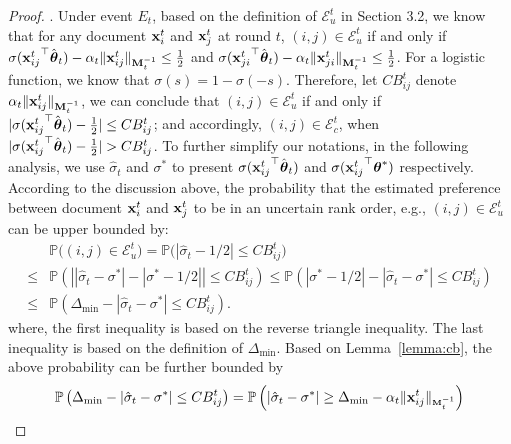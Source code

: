 \begin{proof}
.
Under event $E_t$, based on the definition of $\mathcal{E}_u^t$ in Section 3.2, we know that for any document $\mathbf{x}^t_i$ and $\mathbf{x}^t_j$ at round $t$, $(i, j) \in \mathcal{E}_u^t$ if and only if $\sigma({{\mathbf{x}_{ij}^t}}^\top\hat{\boldsymbol{\theta}}_t) - \alpha_t\Vert{\mathbf{x}_{ij}^t}\Vert_{\mathbf{M}_t^{-1}} \leq \frac{1}{2}$ and $\sigma({{\mathbf{x}_{ji}^t}}^\top\hat{\boldsymbol{\theta}}_t) - \alpha_t\Vert{\mathbf{x}_{ji}^t}\Vert_{\mathbf{M}_t^{-1}} \leq \frac{1}{2}$. 
For a logistic function, we know that $\sigma(s) = 1 - \sigma(-s)$. Therefore, let $CB_{ij}^t$ denote $\alpha_t\Vert{\mathbf{x}_{ij}^t}\Vert_{\mathbf{M}_t^{-1}}$, we can conclude that $(i, j) \in \mathcal{E}_u^t$ if and only if $|\sigma({{\mathbf{x}_{ij}^t}}^\top\hat{\boldsymbol{\theta}}_t )- \frac{1}{2}| \leq CB_{ij}^t$; and accordingly, $(i, j) \in \mathcal{E}_c^t$, when $|\sigma({{\mathbf{x}_{ij}^t}}^\top\hat{\boldsymbol{\theta}}_t) - \frac{1}{2}| > CB_{ij}^t$.  To further simplify our notations, in the following analysis, we use $\hat{\sigma}_t$ and $\sigma^*$ to present $\sigma({{\mathbf{x}_{ij}^t}}^\top\hat{\boldsymbol{\theta}}_t)$ and $\sigma({{\mathbf{x}_{ij}^t}}^\top\boldsymbol{\theta}^*)$ respectively. 
According to the discussion above, the probability that the estimated preference between document $\mathbf{x}^t_i$ and $\mathbf{x}^t_j$ to be in an uncertain rank order, e.g., $(i, j) \in \mathcal{E}_u^t$ can be upper bounded by:
\small
\begin{align*}
    & \mathbb{P}\big((i, j) \in \mathcal{E}_u^t\big) = \mathbb{P}\big(|\hat{\sigma}_t - {1}/{2}| \leq CB_{ij}^t\big) \nonumber \\
    \leq& \mathbb{P}\left(\left||\hat{\sigma}_t - \sigma^*| - |\sigma^* - {1}/{2}|\right| \leq CB_{ij}^t\right) 
    \leq \mathbb{P} \left(|\sigma^* - {1}/{2}| - |\hat{\sigma}_t - \sigma^*| \leq CB_{ij}^t\right) \\
    \leq& \mathbb{P} \left(\Delta_{\min} - |\hat{\sigma}_t - \sigma^*| \leq CB_{ij}^t\right). 
\end{align*}
\normalsize
where, the first inequality is based on the reverse triangle inequality. %
The last inequality is based on the definition of $\Delta_{\min}$. Based on Lemma~\ref{lemma:cb}, the above probability can be further bounded by
\small
\begin{align*}
    &\mathbb{P} \left(\Delta_{\min} - |\hat{\sigma}_t - \sigma^*| \leq CB_{ij}^t\right) = \mathbb{P}\left(|\hat{\sigma}_t - \sigma^*| \geq \Delta_{\min} - \alpha_t\Vert\xijt\Vert_{\sub \bM_t^{-1}}\right) \\

\end{align*}
\end{proof}
